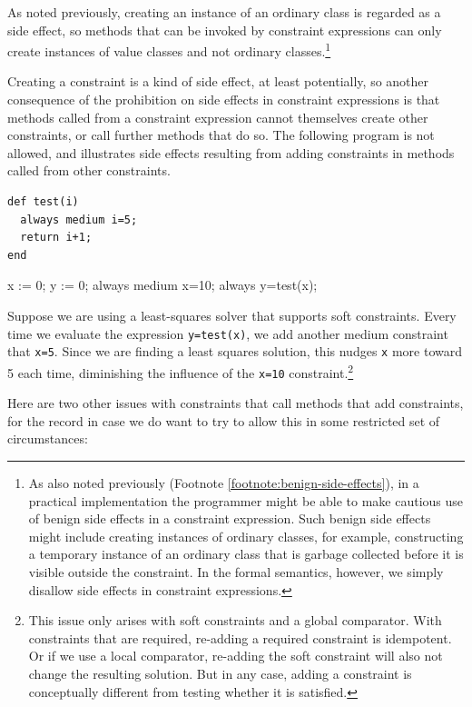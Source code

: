 \documentclass{article}
\begin{document}
As noted previously, creating an instance of an ordinary class is
regarded as a side effect, so methods that can be invoked by
constraint expressions can only create instances of value classes and
not ordinary classes.\footnote{As also noted previously (Footnote
  \ref{footnote:benign-side-effects}), in a practical implementation
  the programmer might be able to make cautious use of benign side effects
  in a constraint expression.  Such benign side effects might include
  creating instances of ordinary classes, for example, constructing a
  temporary instance of an ordinary class that is garbage collected
  before it is visible outside the constraint.  In the formal
  semantics, however, we simply disallow side effects in constraint
  expressions.}

Creating a constraint is a kind of side effect, at least potentially,
so another consequence of the prohibition on side effects in
constraint expressions is that methods called from a constraint
expression cannot themselves create other constraints, or call further
methods that do so.  The following program is not allowed, and
illustrates side effects resulting from adding constraints in methods
called from other constraints.

\begin{verbatim}
def test(i)
  always medium i=5;
  return i+1;
end
\end{verbatim}

\begin{example}
x := 0;
y := 0;
always medium x=10;
always y=test(x);
\end{example}

Suppose we are using a least-squares solver that supports soft
constraints.  Every time we evaluate the expression \verb|y=test(x)|,
we add another medium constraint that \verb|x=5|.  Since we are
finding a least squares solution, this nudges \verb|x| more toward 5
each time, diminishing the influence of the \verb|x=10|
constraint.\footnote{This issue only arises with soft constraints and
  a global comparator.  With constraints that are required, re-adding
  a required constraint is idempotent.  Or if we use a local
  comparator, re-adding the soft constraint will also not change the
  resulting solution.  But in any case, adding a constraint is
  conceptually different from testing whether it is satisfied.}

Here are two other issues with constraints that call methods that add
constraints, for the record in case we do want to try to allow this in
some restricted set of circumstances:
\end{document}

